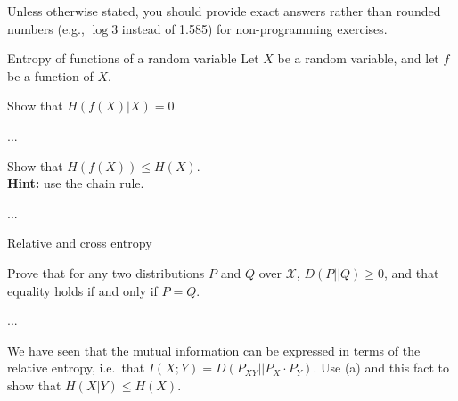 \documentclass[a4paper,10pt]{article}
\begin{document}
\bigskip
\noindent
Unless otherwise stated, you should provide exact answers rather than rounded numbers (e.g., $\log 3$ instead of 1.585) for non-programming exercises.












\begin{nproblem}{5}{Entropy of functions of a random variable}
Let $X$ be a random variable, and let $f$ be a function of $X$.
\end{nproblem}

\begin{subproblem}{2}
Show that $H(f(X) | X) = 0$.
\end{subproblem}

\begin{solution}
...
\end{solution}

\begin{subproblem}{3}
Show that $H(f(X)) \leq H(X)$. \\\textbf{Hint:} use the chain rule.
\end{subproblem}

\begin{solution}
...
\end{solution}



\begin{nproblem}{8}{Relative and cross entropy}
\end{nproblem}

\begin{subproblem}{5}
Prove that for any two distributions $P$ and $Q$ over $\mathcal{X}$, $D(P||Q) \geq 0$, and that equality holds if and only if $P = Q$.
\end{subproblem}

\begin{solution}
...
\end{solution}

\begin{subproblem}{1}
We have seen that the mutual information can be expressed in
        terms of the relative entropy, i.e.\ that $I(X;Y) =
        D(P_{XY}||P_X \cdot P_Y)$. Use (a) and this fact to show that $H(X|Y) \leq H(X)$.
\end{subproblem}
\end{document}
